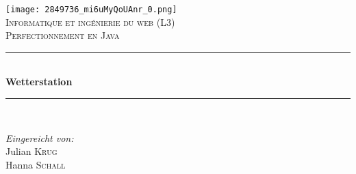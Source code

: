 \documentclass[a4paper]{report}
\begin{document}
\begin{titlepage}

\newcommand{\HRule}{\rule{\linewidth}{0.5mm}} %

\center %
 

\texttt{[image: 2849736\_mi6uMyQoUAnr\_0.png]}\\[1cm] %
\textsc{\Large Informatique et ingénierie du web (L3)}\\[0.5cm] %
\textsc{\large Perfectionnement en Java}\\[0.5cm] %


\HRule \\[0.4cm]
{ \huge \bfseries Wetterstation}\\[0.4cm] %
\HRule \\[1.5cm]
 

\begin{minipage}{0.4\textwidth}
\begin{flushleft} \large
\emph{Eingereicht von:}\\
Julian \textsc{Krug}\\ %
Hanna \textsc{Schall}\\ %
\end{flushleft}

\end{minipage}\\[2cm]



\end{titlepage}
\end{document}
